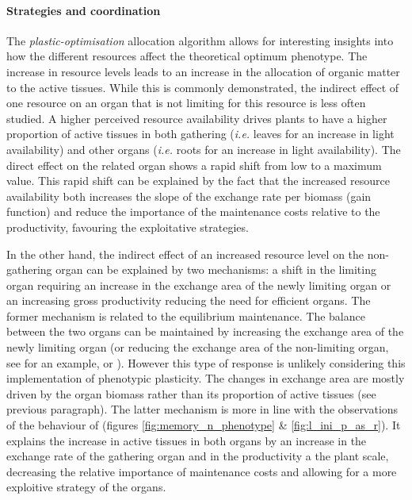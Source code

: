 \paragraph{Strategies and coordination}

The \textit{plastic-optimisation} allocation algorithm allows for interesting insights into how the different resources affect the theoretical optimum phenotype. The increase in resource levels leads to an increase in the allocation of organic matter to the active tissues. While this is commonly demonstrated, the indirect effect of one resource on an organ that is not limiting for this resource is less often studied. A higher perceived resource availability drives plants to have a higher proportion of active tissues in both gathering (\textit{i.e.} leaves for an increase in light availability) and other organs (\textit{i.e.} roots for an increase in light availability). The direct effect on the related organ shows a rapid shift from low to a maximum value. This rapid shift can be explained by the fact that the increased resource availability both increases the slope of the exchange rate per biomass (gain function) and reduce the importance of the maintenance costs relative to the productivity, favouring the exploitative strategies.

In the other hand, the indirect effect of an increased resource level on the non-gathering organ can be explained by two mechanisms: a shift in the limiting organ requiring an increase in the exchange area of the newly limiting organ or an increasing gross productivity reducing the need for efficient organs. The former mechanism is related to the equilibrium maintenance. The balance between the two organs can be maintained by increasing the exchange area of the newly limiting organ (or reducing the exchange area of the non-limiting organ, see \citet{liu_biomass_2004} for an example, or \citet{grassein_plant_2010}). However this type of response is unlikely considering this implementation of phenotypic plasticity. The changes in exchange area are mostly driven by the organ biomass rather than its proportion of active tissues (see previous paragraph). The latter mechanism is more in line with the observations of the behaviour of \model (figures \ref{fig:memory_n_phenotype} \& \ref{fig:l_ini_p_as_r}). It explains the increase in active tissues in both organs by an increase in the exchange rate of the gathering organ and in the productivity a the plant scale, decreasing the relative importance of maintenance costs and allowing for a more exploitive strategy of the organs. 

